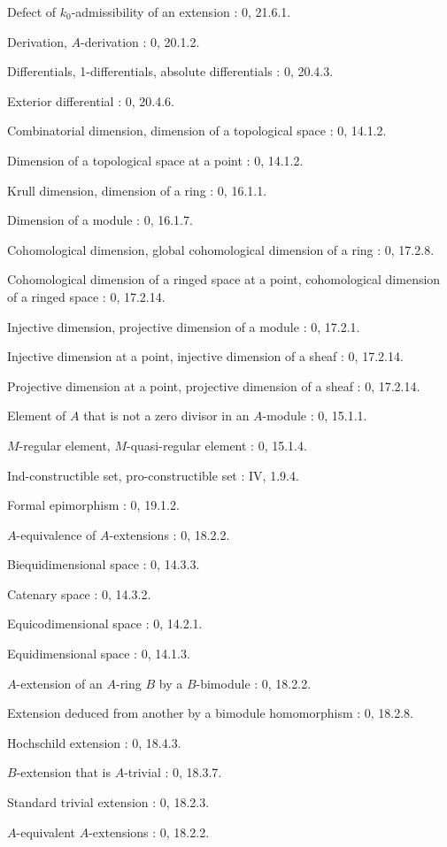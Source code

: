 Defect of $k_0$-admissibility of an extension : 0, 21.6.1.\par
Derivation, $A$-derivation : 0, 20.1.2.\par
Differentials, 1-differentials, absolute differentials : 0, 20.4.3.\par
Exterior differential : 0, 20.4.6.\par
Combinatorial dimension, dimension of a topological space : 0, 14.1.2.\par
Dimension of a topological space at a point : 0, 14.1.2.\par
Krull dimension, dimension of a ring : 0, 16.1.1.\par
Dimension of a module : 0, 16.1.7.\par
Cohomological dimension, global cohomological dimension of a ring : 0, 17.2.8.\par
Cohomological dimension of a ringed space at a point, cohomological dimension of a ringed space : 0, 17.2.14.\par

\clearpage
{}
Injective dimension, projective dimension of a module : 0, 17.2.1.\par
Injective dimension at a point, injective dimension of a sheaf : 0, 17.2.14.\par
Projective dimension at a point, projective dimension of a sheaf : 0, 17.2.14.\par

Element of $A$ that is not a zero divisor in an $A$-module : 0, 15.1.1.\par
$M$-regular element, $M$-quasi-regular element : 0, 15.1.4.\par
Ind-constructible set, pro-constructible set : IV, 1.9.4.\par
Formal epimorphism : 0, 19.1.2.\par
$A$-equivalence of $A$-extensions : 0, 18.2.2.\par
Biequidimensional space : 0, 14.3.3.\par
Catenary space : 0, 14.3.2.\par
Equicodimensional space : 0, 14.2.1.\par
Equidimensional space : 0, 14.1.3.\par
$A$-extension of an $A$-ring $B$ by a $B$-bimodule : 0, 18.2.2.\par
Extension deduced from another by a bimodule homomorphism : 0, 18.2.8.\par
Hochschild extension : 0, 18.4.3.\par
$B$-extension that is $A$-trivial : 0, 18.3.7.\par
Standard trivial extension : 0, 18.2.3.\par
$A$-equivalent $A$-extensions : 0, 18.2.2.\par


